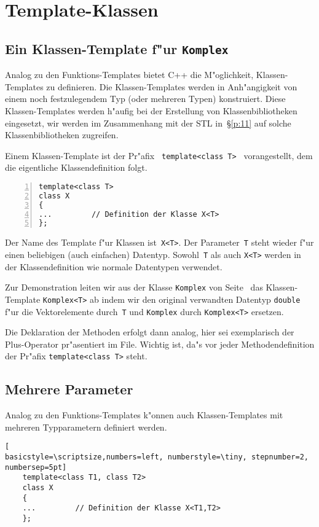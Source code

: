 \section{Template-Klassen}
\label{p:10.2}
\subsection{Ein Klassen-Template f"ur \texttt{Komplex}}
\label{p:10.2.1}
%
Analog zu den Funktions-Templates bietet C++ die M"oglichkeit, Klassen-Templates zu
definieren. Die Klassen-Templates werden in Anh"angigkeit von einem noch
festzulegendem Typ (oder mehreren Typen) konstruiert.
Diese Klassen-Templates werden h"aufig bei der Erstellung von Klassenbibliotheken
eingesetzt, wir werden im Zusammenhang mit der STL in~\S\ref{p:11} auf solche Klassenbibliotheken zugreifen.

Einem Klassen-Template ist der Pr"afix \verb| template<class T> | vorangestellt, dem
die eigentliche Klassendefinition folgt.
%
\begin{lstlisting}[basicstyle=\scriptsize,numbers=left, numberstyle=\tiny, stepnumber=2, numbersep=5pt]
template<class T>
class X
{
...			// Definition der Klasse X<T>
};
\end{lstlisting}
%
Der Name des Template f"ur Klassen ist~\verb|X<T>|. Der Parameter~\texttt{T} steht wieder
f"ur einen beliebigen (auch einfachen) Datentyp. Sowohl~\texttt{T} als auch
\texttt{X<T>} werden in der Klassendefinition wie normale Datentypen verwendet.

Zur Demonstration leiten wir aus der  Klasse \texttt{Komplex}
von Seite~\pageref{lst:komplex_komplex.h_a} das Klassen-Template \texttt{Komplex<T>}
ab
indem wir den original verwandten Datentyp \texttt{double} f"ur die
Vektorelemente durch~\texttt{T} und \texttt{Komplex} durch \texttt{Komplex<T>} ersetzen.
%

Die Deklaration der Methoden erfolgt dann analog, hier sei exemplarisch
der Plus-Operator pr"asentiert im File.
%
Wichtig ist, da"s vor jeder Methodendefinition der Pr"afix \verb|template<class T>| steht.

\subsection{Mehrere Parameter}
\label{p:10.2.2}
Analog zu den Funktions-Templates k"onnen auch Klassen-Templates mit mehreren
Typparametern definiert werden.
%
\begin{lstlisting}[
basicstyle=\scriptsize,numbers=left, numberstyle=\tiny, stepnumber=2, numbersep=5pt]
    template<class T1, class T2>
    class X
    {
    ...			// Definition der Klasse X<T1,T2>
    };
\end{lstlisting}

